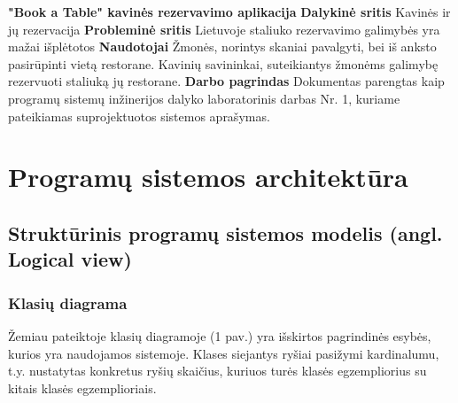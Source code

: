 \documentclass{VUMIFPSkursinis}
\begin{document}
\noindent
{\bfseries "Book a Table" kavinės rezervavimo aplikacija}
\newline
\newline
{\bfseries Dalykinė sritis}
\newline
Kavinės ir jų rezervacija
\newline
\newline
{\bfseries Probleminė sritis}
\newline
 Lietuvoje staliuko rezervavimo galimybės yra mažai išplėtotos
\newline
\newline
{\bfseries Naudotojai}
\newline
Žmonės, norintys skaniai pavalgyti, bei iš anksto pasirūpinti vietą restorane.
\newline
Kavinių savininkai, suteikiantys žmonėms galimybę rezervuoti staliuką jų restorane.
\newline
\newline
{\bfseries Darbo pagrindas}
\newline
Dokumentas parengtas kaip programų sistemų inžinerijos dalyko laboratorinis darbas Nr. 1, kuriame pateikiamas suprojektuotos sistemos aprašymas.
\newline
\newline

\section{Programų sistemos architektūra}
\subsection{Struktūrinis programų sistemos modelis (angl. Logical view)}
\subsubsection{Klasių diagrama}



Žemiau pateiktoje klasių diagramoje (1 pav.) yra išskirtos pagrindinės esybės, kurios yra naudojamos sistemoje. Klases siejantys ryšiai pasižymi kardinalumu, t.y. nustatytas konkretus ryšių skaičius, kuriuos turės klasės egzempliorius su kitais klasės egzemplioriais.
\newline
\newline
\end{document}

